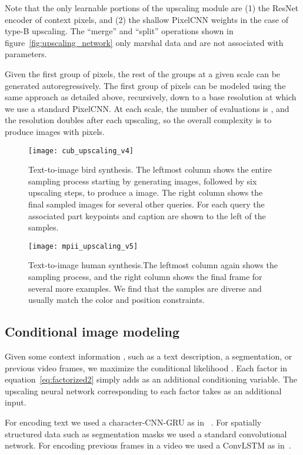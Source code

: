 \documentclass{article}
\begin{document}
Note that the only learnable portions of the upscaling module are (1) the ResNet encoder of context pixels, and (2) the shallow PixelCNN weights in the case of type-B upscaling.
The ``merge'' and ``split'' operations shown in figure~\ref{fig:upscaling_network} only marshal data and are not associated with parameters.

Given the first group of pixels, the rest of the groups at a given scale can be generated autoregressively.
The first group of pixels can be modeled using the same approach as detailed above, recursively, down to a base resolution at which we use a standard PixelCNN.
At each scale, the number of evaluations is , and the resolution doubles after each upscaling, so the overall complexity is  to produce images with  pixels.



\begin{figure*}[t!]
\centering
\texttt{[image: cub\_upscaling\_v4]}
\vspace{-0.3in}
\caption{Text-to-image bird synthesis. The leftmost column shows the entire sampling process starting by generating  images, followed by six upscaling steps, to produce a  image. 
The right column shows the final sampled images for several other queries. For each query the associated part keypoints and caption are shown to the left of the samples.\label{fig:cub}}
\vspace{0.1in}
\texttt{[image: mpii\_upscaling\_v5]}
\vspace{-0.3in}
\caption{Text-to-image human synthesis.The leftmost column again shows the sampling process, and the right column shows the final frame for several more examples. We find that the samples are diverse and usually match the color and position constraints.\label{fig:mpii}}
\vspace{-0.1in}
\end{figure*}

\subsection{Conditional image modeling}
Given some context information , such as a text description, a segmentation, or previous video frames, we maximize the conditional likelihood .
Each factor in equation~\ref{eq:factorized2} simply adds  as an additional conditioning variable.
The upscaling neural network corresponding to each factor takes  as an additional input.

For encoding text we used a character-CNN-GRU as in ~\citep{reed2016learning}.
For spatially structured data such as segmentation masks we used a standard convolutional network.
For encoding previous frames in a video we used a ConvLSTM as in~\citep{kalchbrenner2016video}.
\end{document}
